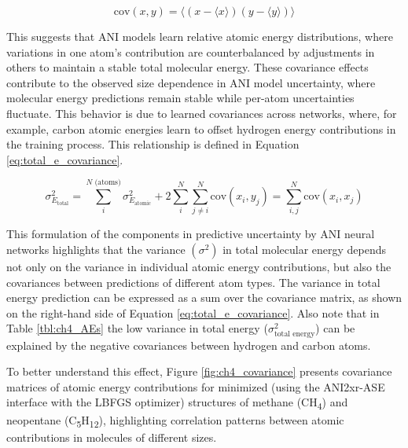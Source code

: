 \begin{equation}
    \label{eq:covariance}
    \text{cov}(x, y) = \langle (x - \langle x \rangle)(y - \langle y \rangle) \rangle
\end{equation}

This suggests that ANI models learn relative atomic energy distributions, where variations in one atom's contribution are counterbalanced by adjustments in others to maintain a stable total molecular energy. 
These covariance effects contribute to the observed size dependence in ANI model uncertainty, where molecular energy predictions remain stable while per-atom uncertainties fluctuate.
This behavior is due to learned covariances across networks, where, for example, carbon atomic energies learn to offset hydrogen energy contributions in the training process. This relationship is defined in Equation \ref{eq:total_e_covariance}.

\begin{equation}
    \sigma_{E_{\text{total}}}^2 = \sum_i^{N \text{ (atoms)}} \sigma_{E_{\text{atomic}}}^2 + 2 \sum_i^N \sum_{j \neq i}^N \text{cov}(x_i, y_j) = \sum_{i,j}^N \text{cov}(x_i, x_j)
    \label{eq:total_e_covariance}
\end{equation}

This formulation of the components in predictive uncertainty by ANI neural networks highlights that the variance $\left( \sigma^2 \right)$ in total molecular energy depends not only on the variance in individual atomic energy contributions, but also the covariances between predictions of different atom types.
The variance in total energy prediction can be expressed as a sum over the covariance matrix, as shown on the right-hand side of Equation \ref{eq:total_e_covariance}. 
Also note that in Table \ref{tbl:ch4_AEs} the low variance in  total energy ($\sigma^2_{\text{total energy}}$) can be explained by the negative covariances between hydrogen and carbon atoms.

To better understand this effect, Figure \ref{fig:ch4_covariance} presents covariance matrices of atomic energy contributions for minimized (using the ANI2xr-ASE interface with the LBFGS \cite{LBFGS} optimizer) structures of methane (CH\textsubscript{4}) and neopentane (C\textsubscript{5}H\textsubscript{12}), highlighting correlation patterns between atomic contributions in molecules of different sizes.

